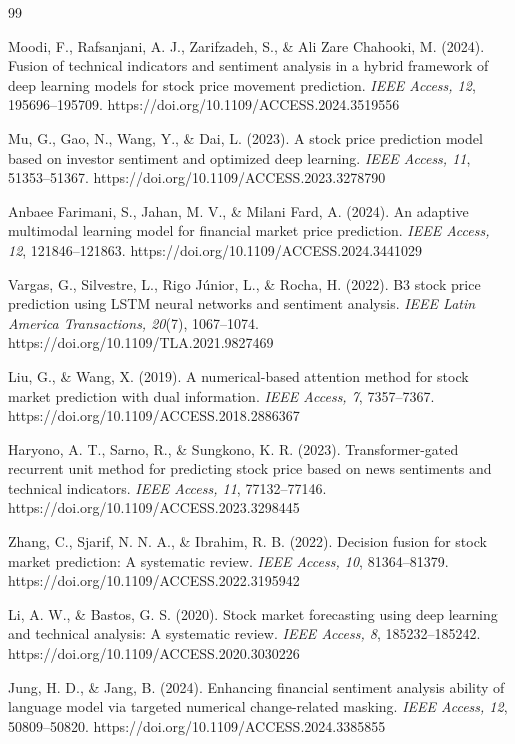 \documentclass[10pt,a4paper,twocolumn]{article}
\begin{document}
\begin{thebibliography}{99}

 Moodi, F., Rafsanjani, A. J., Zarifzadeh, S., \& Ali Zare Chahooki, M. (2024). Fusion of technical indicators and sentiment analysis in a hybrid framework of deep learning models for stock price movement prediction. \textit{IEEE Access, 12}, 195696--195709. https://doi.org/10.1109/ACCESS.2024.3519556

 Mu, G., Gao, N., Wang, Y., \& Dai, L. (2023). A stock price prediction model based on investor sentiment and optimized deep learning. \textit{IEEE Access, 11}, 51353--51367. https://doi.org/10.1109/ACCESS.2023.3278790

 Anbaee Farimani, S., Jahan, M. V., \& Milani Fard, A. (2024). An adaptive multimodal learning model for financial market price prediction. \textit{IEEE Access, 12}, 121846--121863. https://doi.org/10.1109/ACCESS.2024.3441029

 Vargas, G., Silvestre, L., Rigo J\'unior, L., \& Rocha, H. (2022). B3 stock price prediction using LSTM neural networks and sentiment analysis. \textit{IEEE Latin America Transactions, 20}(7), 1067--1074. https://doi.org/10.1109/TLA.2021.9827469

 Liu, G., \& Wang, X. (2019). A numerical-based attention method for stock market prediction with dual information. \textit{IEEE Access, 7}, 7357--7367. https://doi.org/10.1109/ACCESS.2018.2886367

 Haryono, A. T., Sarno, R., \& Sungkono, K. R. (2023). Transformer-gated recurrent unit method for predicting stock price based on news sentiments and technical indicators. \textit{IEEE Access, 11}, 77132--77146. https://doi.org/10.1109/ACCESS.2023.3298445

 Zhang, C., Sjarif, N. N. A., \& Ibrahim, R. B. (2022). Decision fusion for stock market prediction: A systematic review. \textit{IEEE Access, 10}, 81364--81379. https://doi.org/10.1109/ACCESS.2022.3195942

 Li, A. W., \& Bastos, G. S. (2020). Stock market forecasting using deep learning and technical analysis: A systematic review. \textit{IEEE Access, 8}, 185232--185242. https://doi.org/10.1109/ACCESS.2020.3030226

 Jung, H. D., \& Jang, B. (2024). Enhancing financial sentiment analysis ability of language model via targeted numerical change-related masking. \textit{IEEE Access, 12}, 50809--50820. https://doi.org/10.1109/ACCESS.2024.3385855


\end{thebibliography}
\end{document}
